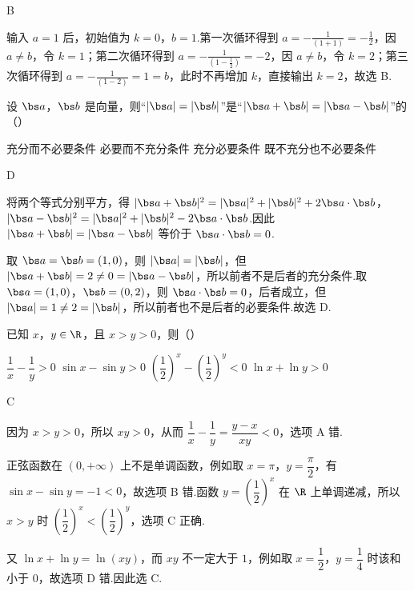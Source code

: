 \begin{answer}
B
\end{answer}

\begin{solution}
输入 \(a=1\) 后，初始值为 \(k=0\)，\(b=1\).第一次循环得到 \(a=-\frac{1}{(1+1)}=-\frac{1}{2}\)，因 \(a\ne b\)，令 \(k=1\)；第二次循环得到 \(a=-\frac{1}{(1-\frac{1}{2})}=-2\)，因 \(a\ne b\)，令 \(k=2\)；第三次循环得到 \(a=-\frac{1}{(1-2)}=1=b\)，此时不再增加 \(k\)，直接输出 \(k=2\)，故选 B.
\end{solution}

\begin{problem}
设 \(\bs a\)，\(\bs b\) 是向量，则“\(|\bs a|=|\bs b|\)”是“\(|\bs a+\bs b|=|\bs a-\bs b|\)”的（\quad）

\choices
    {充分而不必要条件}
    {必要而不充分条件}
    {充分必要条件}
    {既不充分也不必要条件}
\end{problem}

\begin{answer}
D
\end{answer}

\begin{solution}
将两个等式分别平方，得
\(|\bs a+\bs b|^2=|\bs a|^2+|\bs b|^2+2\bs a\cdot\bs b\)，
\(|\bs a-\bs b|^2=|\bs a|^2+|\bs b|^2-2\bs a\cdot\bs b\).因此
\(|\bs a+\bs b|=|\bs a-\bs b|\) 等价于 \(\bs a\cdot\bs b=0\).

取 \(\bs a=\bs b=(1,0)\)，则 \(|\bs a|=|\bs b|\)，但 \(|\bs a+\bs b|=2\ne0=|\bs a-\bs b|\)，所以前者不是后者的充分条件.取 \(\bs a=(1,0)\)，\(\bs b=(0,2)\)，则 \(\bs a\cdot\bs b=0\)，后者成立，但 \(|\bs a|=1\ne2=|\bs b|\)，所以前者也不是后者的必要条件.故选 D.
\end{solution}

\begin{problem}
已知 \(x\)，\(y\in\R\)，且 \(x>y>0\)，则（\quad）

\choices
    {\(\dfrac1x-\dfrac1y>0\)}
    {\(\sin x-\sin y>0\)}
    {\(\left(\dfrac12\right)^x-\left(\dfrac12\right)^y<0\)}
    {\(\ln x+\ln y>0\)}
\end{problem}

\begin{answer}
C
\end{answer}

\begin{solution}
因为 \(x>y>0\)，所以 \(xy>0\)，从而
\(\dfrac1x-\dfrac1y=\dfrac{y-x}{xy}<0\)，选项 A 错.

正弦函数在 \((0,+\infty)\) 上不是单调函数，例如取 \(x=\pi\)，\(y=\dfrac\pi2\)，有 \(\sin x-\sin y=-1<0\)，故选项 B 错.函数 \(y=\left(\dfrac12\right)^x\) 在 \(\R\) 上单调递减，所以 \(x>y\) 时 \(\left(\dfrac12\right)^x<\left(\dfrac12\right)^y\)，选项 C 正确.

又 \(\ln x+\ln y=\ln(xy)\)，而 \(xy\) 不一定大于 \(1\)，例如取 \(x=\dfrac12\)，\(y=\dfrac14\) 时该和小于 \(0\)，故选项 D 错.因此选 C.
\end{solution}

